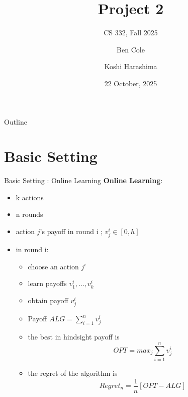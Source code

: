 \documentclass{beamer}
\title[Project 2]{Project 2}
\subtitle{CS 332, Fall 2025}
\author{Ben Cole \and Koshi Harashima}
\date{22 October, 2025}
\begin{document}
\maketitle

\begin{frame}{Outline}
  \tableofcontents
\end{frame}

\section{Basic Setting}

\begin{frame}{Basic Setting : Online Learning}
    \textbf{Online Learning}: 
    \begin{itemize}
        \item k actions
        \item n rounds
        \item action $j$'s payoff in round i ; $v_j^i \in [0,h]$
        \item in round i:
        \begin{itemize}
            \item choose an action $j^i$
            \item learn payoffs $v_1^i, \dots, v_k^i$
            \item obtain payoff $v_j^i$
        \item Payoff $ALG = \sum_{i = 1} ^n v_j^i$
        \item the best in hindsight payoff is 
        \[
        OPT = max_j \sum_{i = 1} ^n v_j^i
        \]
        \item the regret of the algorithm is 
        \[
        Regret_n = \frac{1}{n}[OPT - ALG]
        \]
        \end{itemize}   
    \end{itemize}
\end{frame}
\end{document}
